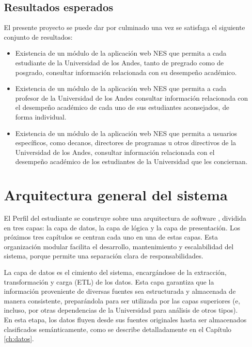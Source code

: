 \subsection{Resultados esperados}

El presente proyecto se puede dar por culminado una vez se satisfaga el siguiente conjunto de resultados:
\begin{itemize}
	\item Existencia de un módulo de la aplicación web \gls{NES} que permita a cada estudiante de la Universidad de los Andes, tanto de pregrado como de posgrado, consultar información relacionada con su desempeño académico.
	\item Existencia de un módulo de la aplicación web \gls{NES} que permita a cada profesor de la Universidad de los Andes consultar información relacionada con el desempeño académico de cada uno de sus estudiantes aconsejados, de forma individual.
	\item Existencia de un módulo de la aplicación web \gls{NES} que permita a usuarios específicos, como decanos, directores de programas u otros directivos de la Universidad de los Andes, consultar información relacionada con el desempeño académico de los estudiantes de la Universidad que les conciernan.
\end{itemize}

\section{Arquitectura general del sistema}

El Perfil del estudiante se construye sobre una arquitectura de software , dividida en tres capas: la capa de datos, la capa de lógica y la capa de presentación. Los próximos tres capítulos se centran cada uno en una de estas capas. Esta organización modular facilita el desarrollo, mantenimiento y escalabilidad del sistema, porque permite una separación clara de responsabilidades.

La capa de datos es el cimiento del sistema, encargándose de la extracción, transformación y carga (\gls{ETL}) de los datos. Esta capa garantiza que la información proveniente de diversas fuentes sea estructurada y almacenada de manera consistente, preparándola para ser utilizada por las capas superiores (e, incluso, por otras dependencias de la Universidad para análisis de otros tipos). En esta etapa, los datos fluyen desde sus fuentes originales hasta ser almacenados clasificados semánticamente, como se describe detalladamente en el Capítulo \ref{ch:datos}.


